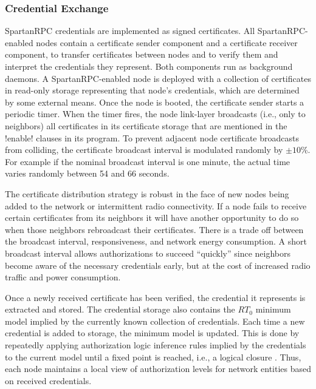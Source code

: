\subsubsection{Credential Exchange}
\label{section-certificate-format}

SpartanRPC credentials are implemented as signed certificates. All SpartanRPC-enabled nodes
contain a certificate sender component and a certificate receiver component, to transfer
certificates between nodes and to verify them and interpret the credentials they represent. Both
components run as background daemons. A SpartanRPC-enabled node is deployed with a collection of
certificates in read-only storage representing that node's credentials, which are determined by
some external means. Once the node is booted, the certificate sender starts a periodic timer.
When the timer fires, the node link-layer broadcasts (i.e., only to neighbors) all certificates
in its certificate storage that are mentioned in the !enable! clauses in its program. To prevent
adjacent node certificate broadcasts from colliding, the certificate broadcast interval is
modulated randomly by $\pm 10$\%. For example if the nominal broadcast interval is one minute,
the actual time varies randomly between 54 and 66 seconds.

The certificate distribution strategy is robust in the face of new nodes being added to the
network or intermittent radio connectivity. If a node fails to receive certain certificates from
its neighbors it will have another opportunity to do so when those neighbors rebroadcast their
certificates. There is a trade off between the broadcast interval, responsiveness, and network
energy consumption. A short broadcast interval allows authorizations to succeed ``quickly''
since neighbors become aware of the necessary credentials early, but at the cost of increased
radio traffic and power consumption.

Once a newly received certificate has been verified, the credential it represents is extracted
and stored. The credential storage also contains the $RT_0$ minimum model implied by the
currently known collection of credentials. Each time a new credential is added to storage, the
minimum model is updated. This is done by repeatedly applying authorization logic inference
rules implied by the credentials to the current model until a fixed point is reached, i.e., a
logical closure \cite{Li:DCFTML}. Thus, each node maintains a local view of authorization levels
for network entities based on received credentials.

